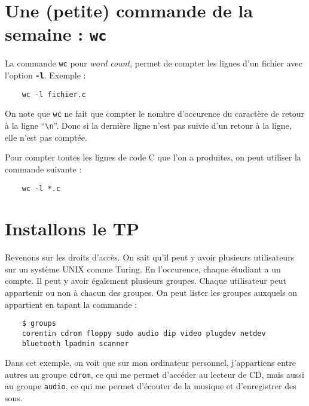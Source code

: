 \documentclass[10pt]{article}
\begin{document}
\newpage

\section{Une (petite) commande de la semaine : {\tt wc}}

\begin{enumerate}[label=\textbf{[\alph*]},resume]
  \setlength\itemsep{1em}

\item La commande {\tt wc} pour \textit{word count}, permet de compter
  les lignes d'un fichier avec l'option \textbf{{\tt -l}}. Exemple :

\begin{verbatim}
    wc -l fichier.c
\end{verbatim}

On note que {\tt wc} ne fait que compter le nombre d'occurence du
caractère de retour à la ligne ``{\tt \textbackslash n}''. Donc si la dernière ligne
n'est pas suivie d'un retour à la ligne, elle n'est pas comptée.

\item Pour compter toutes les lignes de code C que l'on a produites,
  on peut utiliser la commande suivante :

\begin{verbatim}
    wc -l *.c
\end{verbatim}

\end{enumerate}

\section{Installons le TP}

Revenons sur les droits d'accès. On sait qu'il peut y avoir
plusieurs utilisateurs sur un système UNIX comme Turing. En
l'occurence, chaque étudiant a un compte. Il peut y avoir également
plusieurs groupes. Chaque utilisateur peut appartenir ou non à chacun
des groupes. On peut lister les groupes auxquels on appartient en
tapant la commande :

\begin{verbatim}
    $ groups
    corentin cdrom floppy sudo audio dip video plugdev netdev
    bluetooth lpadmin scanner
\end{verbatim}

Dans cet exemple, on voit que sur mon ordinateur personnel,
j'appartiens entre autres au groupe {\tt cdrom}, ce qui me permet
d'accéder au lecteur de CD, mais aussi au groupe {\tt audio}, ce qui
me permet d'écouter de la musique et d'enregistrer des sons.
\end{document}
